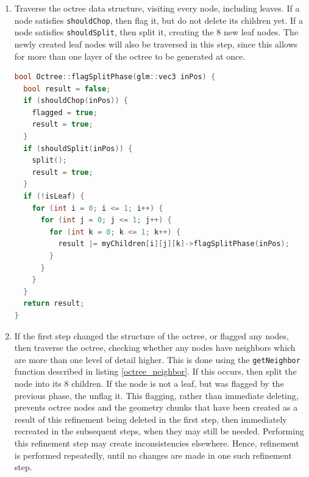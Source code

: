 \documentclass{article}
\begin{document}
\begin{enumerate}
  \item Traverse the octree data structure, visiting every node, including leaves. If a node satisfies \texttt{shouldChop}, then flag it, but do not delete its children yet. If a node satisfies \texttt{shouldSplit}, then split it, creating the 8 new leaf nodes. The newly created leaf nodes will also be traversed in this step, since this allows for more than one layer of the octree to be generated at once.
  
  \begin{lstlisting}[language=C++,label={flagsplitphase},caption={The first stage in the octree refinement process, \texttt{flagSplitPhase}}]
bool Octree::flagSplitPhase(glm::vec3 inPos) {
  bool result = false;
  if (shouldChop(inPos)) {
    flagged = true;
    result = true;
  } 
  if (shouldSplit(inPos)) {
    split();
    result = true;
  }
  if (!isLeaf) {
    for (int i = 0; i <= 1; i++) {
      for (int j = 0; j <= 1; j++) {
        for (int k = 0; k <= 1; k++) {
          result |= myChildren[i][j][k]->flagSplitPhase(inPos);
        }
      }
    }
  }
  return result;
}
  \end{lstlisting}
  \item If the first step changed the structure of the octree, or flagged any nodes, then traverse the octree, checking whether any nodes have neighbors which are more than one level of detail higher. This is done using the \texttt{getNeighbor} function described in listing \ref{octree_neighbor}. If this occurs, then split the node into its 8 children. If the node is not a leaf, but was flagged by the previous phase, the unflag it. This flagging, rather than immediate deleting, prevents octree nodes and the geometry chunks that have been created as a result of this refinement being deleted in the first step, then immediately recreated in the subsequent steps, when they may still be needed. Performing this refinement step may create inconsistencies elsewhere. Hence, refinement is performed repeatedly, until no changes are made in one such refinement step.
  \begin{lstlisting}[language=C++,label={refinephase},caption={The second stage in the octree refinement process, \texttt{refine}. This phase is called repeatedly until no more changes are made. The array \texttt{edgeNeighbors} corresponds to the relative positions of the neighboring chunks, at the same level of detail, and the variable \texttt{childPosition} gives the position of the child to check in each neighbor. The flow of this code is complicated, and is designed such that exactly the 4 children of the neighboring chunk that touch this chunk are checked.}] 

\end{lstlisting}
\end{enumerate}
\end{document}
